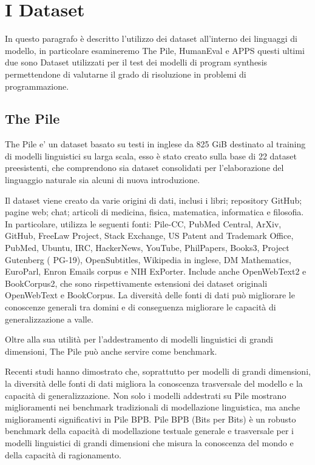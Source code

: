 \newpage
\section{I Dataset}
In questo paragrafo è descritto l'utilizzo dei dataset all'interno dei linguaggi di modello, in particolare esamineremo The Pile, HumanEval e APPS questi ultimi due sono Dataset utilizzati per il test dei modelli di program synthesis permettendone di valutarne il grado di risoluzione in problemi di programmazione.
\subsection{The Pile}
The Pile e' un dataset basato su testi in inglese da 825 GiB destinato al training di modelli linguistici su larga scala, esso è stato creato sulla base di 22 dataset preesistenti, che comprendono sia dataset consolidati per l'elaborazione del linguaggio naturale sia alcuni di nuova introduzione.

Il dataset viene creato da varie origini di dati, inclusi i libri; repository GitHub; pagine web; chat; articoli di medicina, fisica, matematica, informatica e filosofia. In particolare, utilizza le seguenti fonti: Pile-CC, PubMed Central, ArXiv, GitHub, FreeLaw Project, Stack Exchange, US Patent and Trademark Office, PubMed, Ubuntu, IRC, HackerNews, YouTube, PhilPapers, Books3, Project Gutenberg ( PG-19), OpenSubtitles, Wikipedia in inglese, DM Mathematics, EuroParl, Enron Emails corpus e NIH ExPorter. Include anche OpenWebText2 e BookCorpus2, che sono rispettivamente estensioni dei dataset originali OpenWebText e BookCorpus. La diversità delle fonti di dati può migliorare le conoscenze generali tra domini e di conseguenza migliorare le capacità di generalizzazione a valle.

Oltre alla sua utilità per l'addestramento di modelli linguistici di grandi dimensioni, The Pile può anche servire come benchmark.

Recenti studi hanno dimostrato che, soprattutto per modelli di grandi dimensioni, la diversità delle fonti di dati migliora la conoscenza trasversale del modello e la capacità di generalizzazione. Non solo i modelli addestrati su Pile mostrano miglioramenti nei benchmark tradizionali di modellazione linguistica, ma anche miglioramenti significativi in Pile BPB. 
Pile BPB (Bits per Bits) è un robusto benchmark della capacità di modellazione testuale generale e trasversale per i modelli linguistici di grandi dimensioni che misura la conoscenza del mondo e della capacità di ragionamento. \cite{pile}

